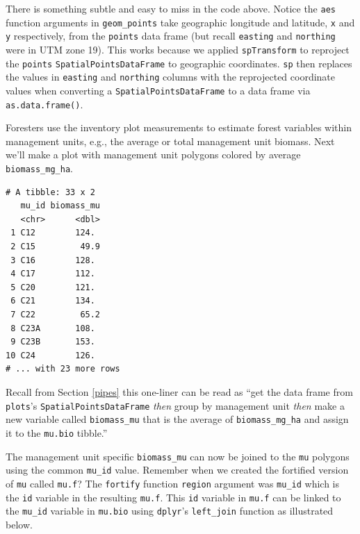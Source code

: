 \documentclass[]{krantz}
\makeatletter
\newenvironment{Shaded}{\begin{snugshade}}{\end{snugshade}}
\newcommand{\DataTypeTok}[1]{\textcolor[rgb]{0.27,0.27,0.27}{#1}}
\newcommand{\KeywordTok}[1]{\textcolor[rgb]{0.27,0.27,0.27}{\textbf{#1}}}
\newcommand{\NormalTok}[1]{#1}
\newcommand{\OperatorTok}[1]{\textcolor[rgb]{0.43,0.43,0.43}{\textbf{#1}}}
\newcommand{\StringTok}[1]{\textcolor[rgb]{0.5,0.5,0.5}{#1}}
\newenvironment{kframe}{%
\medskip{}
\setlength{\fboxsep}{.8em}
 \def\at@end@of@kframe{}%
 \ifinner\ifhmode%
  \def\at@end@of@kframe{\end{minipage}}%
  \begin{minipage}{\columnwidth}%
 \fi\fi%
 \def\FrameCommand##1{\hskip\@totalleftmargin \hskip-\fboxsep
 \colorbox{shadecolor}{##1}\hskip-\fboxsep
     \hskip-\linewidth \hskip-\@totalleftmargin \hskip\columnwidth}%
 \MakeFramed {\advance\hsize-\width
   \@totalleftmargin\z@ \linewidth\hsize
   \@setminipage}}%
 {\par\unskip\endMakeFramed%
 \at@end@of@kframe}
\renewenvironment{Shaded}{\begin{kframe}}{\end{kframe}}
\makeatother
\begin{document}
There is something subtle and easy to miss in the code above. Notice the \texttt{aes} function arguments in \texttt{geom\_points} take geographic longitude and latitude, \texttt{x} and \texttt{y} respectively, from the \texttt{points} data frame (but recall \texttt{easting} and \texttt{northing} were in UTM zone 19). This works because we applied \texttt{spTransform} to reproject the \texttt{points} \texttt{SpatialPointsDataFrame} to geographic coordinates. \texttt{sp} then replaces the values in \texttt{easting} and \texttt{northing} columns with the reprojected coordinate values when converting a \texttt{SpatialPointsDataFrame} to a data frame via \texttt{as.data.frame()}.

Foresters use the inventory plot measurements to estimate forest variables within management units, e.g., the average or total management unit biomass. Next we'll make a plot with management unit polygons colored by average \texttt{biomass\_mg\_ha}.

\begin{Shaded}
\end{Shaded}

\begin{verbatim}
# A tibble: 33 x 2
   mu_id biomass_mu
   <chr>      <dbl>
 1 C12        124. 
 2 C15         49.9
 3 C16        128. 
 4 C17        112. 
 5 C20        121. 
 6 C21        134. 
 7 C22         65.2
 8 C23A       108. 
 9 C23B       153. 
10 C24        126. 
# ... with 23 more rows
\end{verbatim}

Recall from Section \ref{pipes} this one-liner can be read as ``get the data frame from \texttt{plots}'s \texttt{SpatialPointsDataFrame} \emph{then} group by management unit \emph{then} make a new variable called \texttt{biomass\_mu} that is the average of \texttt{biomass\_mg\_ha} and assign it to the \texttt{mu.bio} tibble.''

The management unit specific \texttt{biomass\_mu} can now be joined to the \texttt{mu} polygons using the common \texttt{mu\_id} value. Remember when we created the fortified version of \texttt{mu} called \texttt{mu.f}? The \texttt{fortify} function \texttt{region} argument was \texttt{mu\_id} which is the \texttt{id} variable in the resulting \texttt{mu.f}. This \texttt{id} variable in \texttt{mu.f} can be linked to the \texttt{mu\_id} variable in \texttt{mu.bio} using \texttt{dplyr}'s \texttt{left\_join} function as illustrated below.
\end{document}
